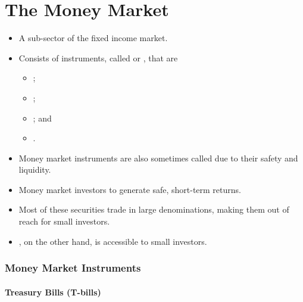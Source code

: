 \documentclass[notoc,notitlepage]{tufte-book}
\begin{document}
\section{The Money Market}%
\label{sec:the_money_market}

\begin{itemize}
  \item A sub-sector of the fixed income market.
  \item Consists of instruments, called 
    or , that are
    \begin{itemize}
      \item {};
      \item {};
      \item {}; and
      \item {}.
    \end{itemize}
  \item Money market instruments are also sometimes called
     due to their safety and liquidity.
  \item Money market investors  to generate
    safe, short-term returns.
  \item Most of these securities trade in large denominations,
    making them out of reach for small investors.
  \item {}, on the other hand,
    is accessible to small investors.
\end{itemize}

\subsubsection{Money Market Instruments}%
\label{ssub:money_market_instruments}

\paragraph{Treasury Bills (T-bills)}\label{para:t_bills}
\end{document}
